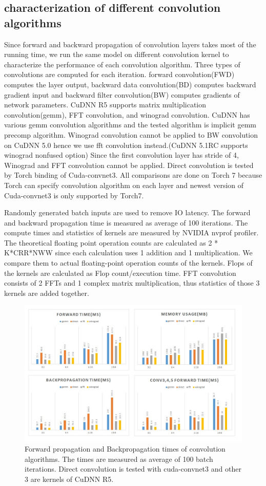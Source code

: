 \subsection{characterization of different convolution algorithms}
Since forward and backward propagation of convolution layers takes most of the running time, we run the same model on different convolution kernel to characterize the performance of each convolution algorithm.
Three types of convolutions are computed for each iteration.
forward convolution(FWD) computes the layer output, backward data convolution(BD) computes backward gradient input and backward filter convolution(BW) computes gradients of network parameters.
CuDNN R5 supports matrix multiplication convolution(gemm), FFT convolution, and winograd convolution.
CuDNN has various gemm convolution algorithms and the tested algorithm is implicit gemm precomp algorithm.
Winograd convolution cannot be applied to BW convolution on CuDNN 5.0 hence we use fft convolution instead.(CuDNN 5.1RC supports winograd nonfused option)
Since the first convolution layer has stride of 4, Winograd and FFT convolution cannot be applied.
Direct convolution is tested by Torch binding of Cuda-convnet3.
All comparisons are done on Torch 7 because Torch can specify convolution algorithm on each layer and newest version of Cuda-convnet3 is only supported by Torch7.

Randomly generated batch inputs are used to remove IO latency.
The forward and backward propagation time is measured as average of 100 iterations.
The compute times and statistics of kernels are measured by NVIDIA nvprof profiler.
The theoretical floating point operation counts are calculated as 2 * K*CRR*NWW since each calculation uses 1 addition and 1 multiplication.
We compare them to actual floating-point operation counts of the kernels.
Flops of the kernels are calculated as Flop count/execution time.
FFT convolution consists of 2 FFTs and 1 complex matrix multiplication, thus statistics of those 3 kernels are added together.

\begin{figure}
  \centering
  \includegraphics[width=\linewidth]{./figures/conv_time}
  \caption{Forward propagation and Backpropagation times of convolution algorithms. The times are measured as average of 100 batch iterations. 
Direct convolution is tested with cuda-convnet3 and other 3 are kernels of CuDNN R5. }
  \label{fig_conv_time}
\end{figure}

